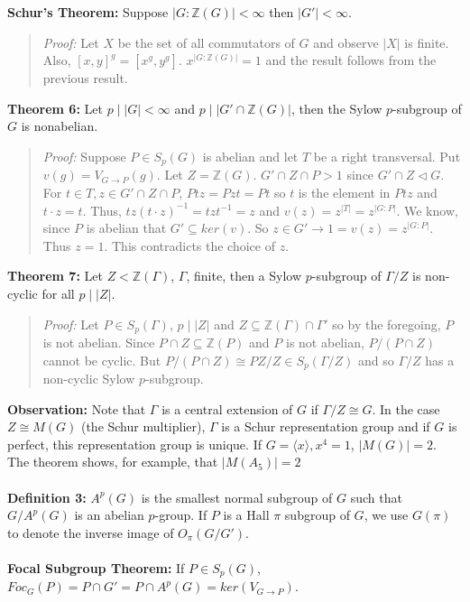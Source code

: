 {\bf Schur's Theorem:} 
Suppose $|G:{\mathbb Z}(G)| < \infty$ then $|G'|< \infty$.
\begin{quote}
\emph{Proof:}  
Let $X$ be the set of all commutators of $G$ and observe $|X|$ is finite.  Also,
$[x,y]^g= [x^g, y^g]$.  
$x^{|G:{\mathbb Z }(G)|}=1$ and the result follows from the previous result.
\end{quote}
{\bf Theorem 6:} Let $p \mid |G| < \infty$ and $p \mid |G' \cap {\mathbb Z}(G)|$, then
the Sylow $p$-subgroup of $G$ is nonabelian.
\begin{quote}
\emph{Proof:}  
Suppose $P \in S_p(G)$ is abelian and let $T$ be a right transversal.  Put
$v(g)= V_{G \rightarrow P}(g)$. Let $Z= {\mathbb Z}(G)$.  
$G' \cap Z \cap P > 1$ since $G' \cap Z \lhd G$.
For $t \in T, z \in G' \cap Z \cap P$, $Ptz=Pzt=Pt$ so $t$ is the element in $Ptz$ and
$t \cdot z= t$.  Thus, $tz(t \cdot z)^{-1}= tzt^{-1}=z$ and $v(z)= z^{|T|}=z^{|G:P|}$.
We know, since $P$ is abelian that $G' \subseteq ker(v)$. So 
$z \in G'\rightarrow 1=v(z)=z^{|G:P|}$.  Thus $z=1$.  This contradicts the choice of $z$.
\end{quote}
{\bf Theorem 7:} Let $Z < {\mathbb Z}(\Gamma)$, $\Gamma$, finite, then a Sylow $p$-subgroup of
$\Gamma/Z$ is non-cyclic for all $p \mid |Z|$.
\begin{quote}
\emph{Proof:}  
Let $P \in S_p( \Gamma )$, $p \mid |Z|$ and $Z \subseteq {\mathbb Z}( \Gamma ) \cap \Gamma'$
so by the foregoing, $P$ is not abelian.  Since $P \cap Z \subseteq {\mathbb Z}(P)$ and
$P$ is not abelian, $P/(P \cap Z)$ cannot be cyclic.  
But $P/(P \cap Z) \cong PZ/Z \in S_p(\Gamma/Z)$ and so $\Gamma/Z$ has a 
non-cyclic Sylow $p$-subgroup.
\end{quote}
{\bf Observation:} Note that $\Gamma$ is a central extension of $G$ if $\Gamma/Z \cong G$.
In the case $Z \cong M(G)$ (the Schur multiplier), $\Gamma$ is a Schur representation group and
if $G$ is perfect, this representation group is unique.  
If $G= \langle x \rangle , x^4=1$, $|M(G)|=2$.  The
theorem shows, for example, that $|M(A_5)|=2$
\\
\\
{\bf Definition 3:} $A^p(G)$ is the smallest normal subgroup of $G$ such that
$G/A^p(G)$ is an abelian $p$-group.  If $P$ is a Hall $\pi$ subgroup of $G$,
we use $G(\pi)$ to denote the inverse image of $O_{\pi}(G/G')$.
\\
\\
{\bf Focal Subgroup Theorem:}  
If $P \in S_p(G)$, $Foc_G(P) = P \cap G' = P \cap A^p(G) = ker(V_{G \rightarrow P})$.

